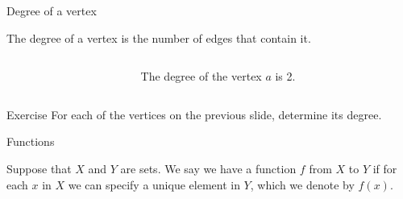 \begin{frame}{Degree of a vertex}

	\begin{definition}
		The degree of a vertex is the number of edges that contain it.
	\end{definition}
	  
  \begin{center}
    \begin{columns}
      \begin{column}{0.2\textwidth}
      \end{column}
      \begin{column}{0.5\textwidth}
          The degree of the vertex $a$ is 2.
      \end{column}
    \end{columns}
  \end{center}

  \begin{block}{Exercise}
    For each of the vertices on the previous slide, determine its degree.
  \end{block}

\end{frame}


\begin{frame}{Functions}

	\begin{definition}
		Suppose that $X$ and $Y$ are sets.
		We say we have a function $f$ from $X$ to $Y$ if for each $x$ in $X$ we can specify a unique element in $Y$, which we denote by $f(x)$.
	\end{definition}

	\begin{center}
	\end{center}

\end{frame}



